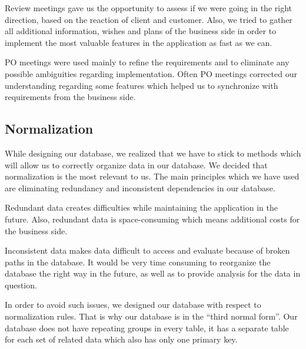 Review meetings gave us the opportunity to assess if we were going in the right direction, based on the reaction of client and customer. Also, we tried to gather all additional information, wishes and plans of the business side in order to implement the most valuable features in the application as fast as we can.

PO meetings were used mainly to refine the requirements and to eliminate any possible ambiguities regarding implementation. Often PO meetings corrected our understanding regarding some features which helped us to synchronize with requirements from the business side.

\subsection{Normalization}
While designing our database, we realized that we have to stick to methods which will allow us to correctly organize data in our database. We decided that normalization is the most relevant to us. The main principles which we have used are eliminating redundancy and inconsistent dependencies in our database.

Redundant data creates difficulties while maintaining the application in the future. Also, redundant data is space-consuming which means additional costs for the business side.

Inconsistent data makes data difficult to access and evaluate because of broken paths in the database. It would be very time consuming to reorganize the database the right way in the future, as well as to provide analysis for the data in question.

In order to avoid such issues, we designed our database with respect to normalization rules. That is why our database is in the “third normal form”. Our database does not have repeating groups in every table, it has a separate table for each set of related data which also has only one primary key.

